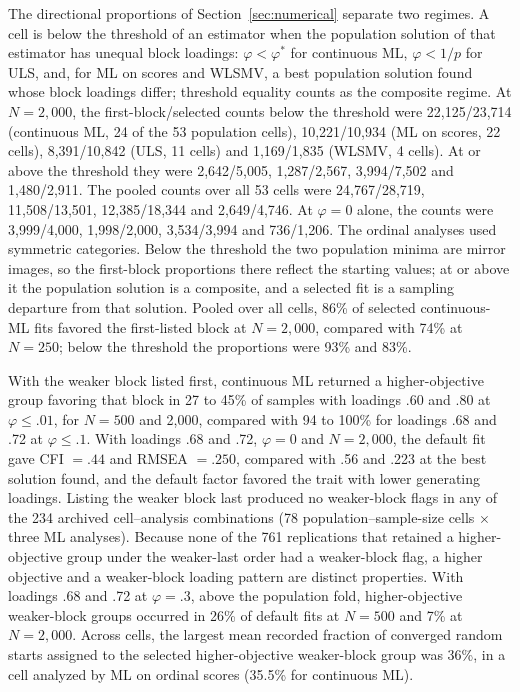 The directional proportions of Section~\ref{sec:numerical} separate two regimes. A cell is below the threshold of an estimator when the population solution of that estimator has unequal block loadings: $\varphi<\varphi^*$ for continuous ML, $\varphi<1/p$ for ULS, and, for ML on scores and WLSMV, a best population solution found whose block loadings differ; threshold equality counts as the composite regime. At $N=2{,}000$, the first-block/selected counts below the threshold were 22,125/23,714 (continuous ML, 24 of the 53 population cells), 10,221/10,934 (ML on scores, 22 cells), 8,391/10,842 (ULS, 11 cells) and 1,169/1,835 (WLSMV, 4 cells). At or above the threshold they were 2,642/5,005, 1,287/2,567, 3,994/7,502 and 1,480/2,911. The pooled counts over all 53 cells were 24,767/28,719, 11,508/13,501, 12,385/18,344 and 2,649/4,746. At $\varphi=0$ alone, the counts were 3,999/4,000, 1,998/2,000, 3,534/3,994 and 736/1,206. The ordinal analyses used symmetric categories. Below the threshold the two population minima are mirror images, so the first-block proportions there reflect the starting values; at or above it the population solution is a composite, and a selected fit is a sampling departure from that solution. Pooled over all cells, 86\% of selected continuous-ML fits favored the first-listed block at $N=2{,}000$, compared with 74\% at $N=250$; below the threshold the proportions were 93\% and 83\%.

With the weaker block listed first, continuous ML returned a higher-objective group favoring that block in 27 to 45\% of samples with loadings .60 and .80 at $\varphi\le.01$, for $N=500$ and 2,000, compared with 94 to 100\% for loadings .68 and .72 at $\varphi\le.1$. With loadings .68 and .72, $\varphi=0$ and $N=2{,}000$, the default fit gave CFI $=.44$ and RMSEA $=.250$, compared with .56 and .223 at the best solution found, and the default factor favored the trait with lower generating loadings. Listing the weaker block last produced no weaker-block flags in any of the 234 archived cell--analysis combinations (78 population--sample-size cells $\times$ three ML analyses). Because none of the 761 replications that retained a higher-objective group under the weaker-last order had a weaker-block flag, a higher objective and a weaker-block loading pattern are distinct properties. With loadings .68 and .72 at $\varphi=.3$, above the population fold, higher-objective weaker-block groups occurred in 26\% of default fits at $N=500$ and 7\% at $N=2{,}000$. Across cells, the largest mean recorded fraction of converged random starts assigned to the selected higher-objective weaker-block group was 36\%, in a cell analyzed by ML on ordinal scores (35.5\% for continuous ML).

